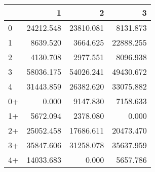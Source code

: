 \begin{tabular}{lrrr}
\toprule
     &         1 &         2 &         3 \\
\midrule
 0   & \num{24212.548} & \num{23810.081} &  \num{8131.873} \\
 1   &  \num{8639.520} &  \num{3664.625} & \num{22888.255} \\
 2   &  \num{4130.708} &  \num{2977.551} &  \num{8096.938} \\
 3   & \num{58036.175} & \num{54026.241} & \num{49430.672} \\
 4   & \num{31443.859} & \num{26382.620} & \num{33075.882} \\
 0+  &     \num{0.000} &  \num{9147.830} &  \num{7158.633} \\
 1+  &  \num{5672.094} &  \num{2378.080} &     \num{0.000} \\
 2+  & \num{25052.458} & \num{17686.611} & \num{20473.470} \\
 3+  & \num{35847.606} & \num{31258.078} & \num{35637.959} \\
 4+  & \num{14033.683} &     \num{0.000} &  \num{5657.786} \\
\bottomrule
\end{tabular}
